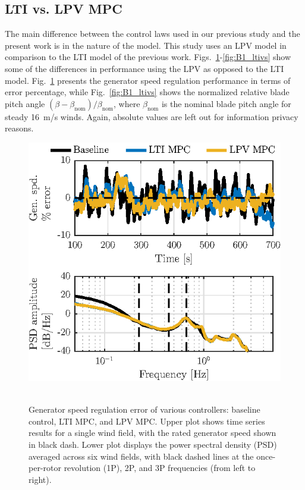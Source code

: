 \documentclass[letterpaper, 10 pt, conference]{ieeeconf}  %
\begin{document}
\subsection{LTI vs. LPV MPC}
The main difference between the control laws used in our previous study \cite{Sinner2018} and the present work is in the nature of the model. This study uses an LPV model in comparison to the LTI model of the previous work. Figs.~\ref{fig:GS_ltivs}-\ref{fig:B1_ltivs} show some of the differences in performance using the LPV as opposed to the LTI model. Fig.~\ref{fig:GS_ltivs} presents the generator speed regulation performance in terms of error percentage, while Fig.~\ref{fig:B1_ltivs} shows the normalized relative blade pitch angle $\left(\beta - \beta_\mathrm{nom}\right)/ \beta_\mathrm{nom}$, where $\beta_\mathrm{nom}$ is the nominal blade pitch angle for steady 16~m/s winds. Again, absolute values are left out for information privacy reasons.
\begin{figure}[thbp]
	\centering
	\mbox{\includegraphics[scale=1.0]{GS_ltivs.eps}
	}
	\caption{Generator speed regulation error of various controllers: baseline control, LTI MPC, and LPV MPC. Upper plot shows time series results for a single wind field, with the rated generator speed shown in black dash. Lower plot displays the power spectral density (PSD) averaged across six wind fields, with black dashed lines at the once-per-rotor revolution (1P), 2P, and 3P frequencies (from left to right).}
	\label{fig:GS_ltivs}
\end{figure}
\end{document}
